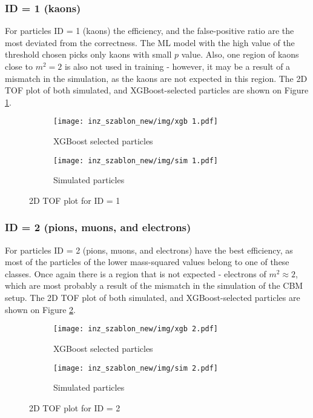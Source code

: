 \subsubsection{ID = 1 (kaons)}
For particles ID = 1 (kaons) the efficiency, and the false-positive ratio are the most deviated from the correctness. The ML model with the high value of the threshold chosen picks only kaons with small $p$ value. Also, one region of kaons close to $m^2 = 2$ is also not used in training - however, it may be a result of a mismatch in the simulation, as the kaons are not expected in this region. The 2D TOF plot of both simulated, and XGBoost-selected particles are shown on Figure \ref{2D TOF id1}.
\begin{figure}[H]
 \centering
    \begin{subfigure}[b]{0.8\linewidth} 
        \centering
        \texttt{[image: inz\_szablon\_new/img/xgb 1.pdf]}
        \caption{XGBoost selected particles}
        \vspace{0.3cm}
    \end{subfigure}
     \hfill
       \begin{subfigure}[b]{0.8\linewidth}
        \centering
        \texttt{[image: inz\_szablon\_new/img/sim 1.pdf]}
        \caption{Simulated particles}
        \vspace{0.3cm}
    \end{subfigure}
    \caption{2D TOF plot for ID = 1}
     \label{2D TOF id1}
\end{figure}
\clearpage

\subsubsection{ID = 2 (pions, muons, and electrons)}
For particles ID = 2 (pions, muons, and electrons) have the best efficiency, as most of the particles of the lower mass-squared values belong to one of these classes. Once again there is a region that is not expected - electrons of $m^2 \approx 2$, which are most probably a result of the mismatch in the simulation of the CBM setup. The 2D TOF plot of both simulated, and XGBoost-selected particles are shown on Figure \ref{2D TOF id2}.
\begin{figure}[H]
 \centering
    \begin{subfigure}[b]{0.8\linewidth} 
        \centering
        \texttt{[image: inz\_szablon\_new/img/xgb 2.pdf]}
        \caption{XGBoost selected particles}
        \vspace{0.3cm}
    \end{subfigure}
     \hfill
       \begin{subfigure}[b]{0.8\linewidth}
        \centering
        \texttt{[image: inz\_szablon\_new/img/sim 2.pdf]}
        \caption{Simulated particles}
        \vspace{0.3cm}
    \end{subfigure}
    \caption{2D TOF plot for ID = 2}
     \label{2D TOF id2}
\end{figure}
\clearpage

